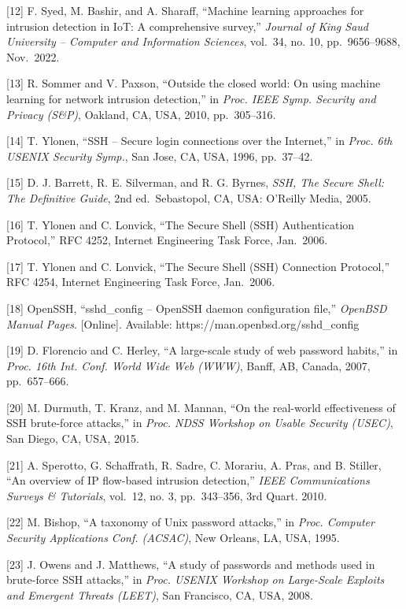 \documentclass[
  a4paper]{report}
\begin{document}
{[}12{]} F. Syed, M. Bashir, and A. Sharaff, ``Machine learning
approaches for intrusion detection in IoT: A comprehensive survey,''
\emph{Journal of King Saud University -- Computer and Information
Sciences}, vol.~34, no. 10, pp.~9656--9688, Nov.~2022.

{[}13{]} R. Sommer and V. Paxson, ``Outside the closed world: On using
machine learning for network intrusion detection,'' in \emph{Proc. IEEE
Symp. Security and Privacy (S\&P)}, Oakland, CA, USA, 2010,
pp.~305--316.

{[}14{]} T. Ylonen, ``SSH -- Secure login connections over the
Internet,'' in \emph{Proc. 6th USENIX Security Symp.}, San Jose, CA,
USA, 1996, pp.~37--42.

{[}15{]} D. J. Barrett, R. E. Silverman, and R. G. Byrnes, \emph{SSH,
The Secure Shell: The Definitive Guide}, 2nd ed.~Sebastopol, CA, USA:
O'Reilly Media, 2005.

{[}16{]} T. Ylonen and C. Lonvick, ``The Secure Shell (SSH)
Authentication Protocol,'' RFC 4252, Internet Engineering Task Force,
Jan.~2006.

{[}17{]} T. Ylonen and C. Lonvick, ``The Secure Shell (SSH) Connection
Protocol,'' RFC 4254, Internet Engineering Task Force, Jan.~2006.

{[}18{]} OpenSSH, ``sshd\_config -- OpenSSH daemon configuration file,''
\emph{OpenBSD Manual Pages}. {[}Online{]}. Available:
https://man.openbsd.org/sshd\_config

{[}19{]} D. Florencio and C. Herley, ``A large-scale study of web
password habits,'' in \emph{Proc. 16th Int. Conf. World Wide Web (WWW)},
Banff, AB, Canada, 2007, pp.~657--666.

{[}20{]} M. Durmuth, T. Kranz, and M. Mannan, ``On the real-world
effectiveness of SSH brute-force attacks,'' in \emph{Proc. NDSS Workshop
on Usable Security (USEC)}, San Diego, CA, USA, 2015.

{[}21{]} A. Sperotto, G. Schaffrath, R. Sadre, C. Morariu, A. Pras, and
B. Stiller, ``An overview of IP flow-based intrusion detection,''
\emph{IEEE Communications Surveys \& Tutorials}, vol.~12, no. 3,
pp.~343--356, 3rd Quart. 2010.

{[}22{]} M. Bishop, ``A taxonomy of Unix password attacks,'' in
\emph{Proc. Computer Security Applications Conf. (ACSAC)}, New Orleans,
LA, USA, 1995.

{[}23{]} J. Owens and J. Matthews, ``A study of passwords and methods
used in brute-force SSH attacks,'' in \emph{Proc. USENIX Workshop on
Large-Scale Exploits and Emergent Threats (LEET)}, San Francisco, CA,
USA, 2008.
\end{document}

